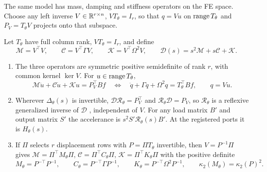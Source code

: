 The same model has mass, damping and stiffness operators on the FE space.
Choose any left inverse $V\in\mathbb R^{r\times n}$, $VT_\theta=I_r$, so that $q=Vu$
on $\operatorname{range} T_\theta$ and $P_V=T_\theta V$ projects onto that subspace.
\begin{theorem}[Realization]\label{thm:realization}
Let $T_\theta$ have full column rank, $VT_\theta=I_r$, and define
\begin{equation}
 \mathcal M=V^{\top}V,\qquad
 \mathcal C=V^{\top}\Gamma V,\qquad
 \mathcal K=V^{\top}\Omega^2V,\qquad
 \mathcal D(s)=s^2\mathcal M+s\mathcal C+\mathcal K.
 \label{eq:realization}
\end{equation}
\begin{enumerate}
\item[(i)] The three operators are symmetric positive semidefinite of rank
$r$, with common kernel $\ker V$. For $u\in\operatorname{range} T_\theta$,
\[
 \mathcal M\ddot u+\mathcal C\dot u+\mathcal Ku=P_V^{\top}Bf
 \quad\Longleftrightarrow\quad
 \ddot q+\Gamma\dot q+\Omega^2q=T_\theta^{\top}Bf,\qquad q=Vu.
\]
\item[(ii)] Wherever $\Delta_\theta(s)$ is invertible,
$\mathcal D\mathcal R_\theta=P_V^{\top}$ and
$\mathcal R_\theta\mathcal D=P_V$, so $\mathcal R_\theta$ is a reflexive
generalized inverse of $\mathcal D$ \citep{benisrael2003}, independent of
$V$. For any load matrix $B'$ and output matrix $S'$ the accelerance is
$s^2S'\mathcal R_\theta(s)B'$. At the registered ports it is $H_\theta(s)$.
\item[(iii)] If $\Pi$ selects $r$ displacement rows with $P=\Pi T_\theta$
invertible, then $V=P^{-1}\Pi$ gives $\mathcal M=\Pi^{\top}M_\theta\Pi$,
$\mathcal C=\Pi^{\top}C_\theta\Pi$, $\mathcal K=\Pi^{\top}K_\theta\Pi$ with the
positive definite
\[
 M_\theta=P^{-\top}P^{-1},\qquad
 C_\theta=P^{-\top}\Gamma P^{-1},\qquad
 K_\theta=P^{-\top}\Omega^2P^{-1},\qquad
 \kappa_2(M_\theta)=\kappa_2(P)^2.
\]
\end{enumerate}
\end{theorem}

